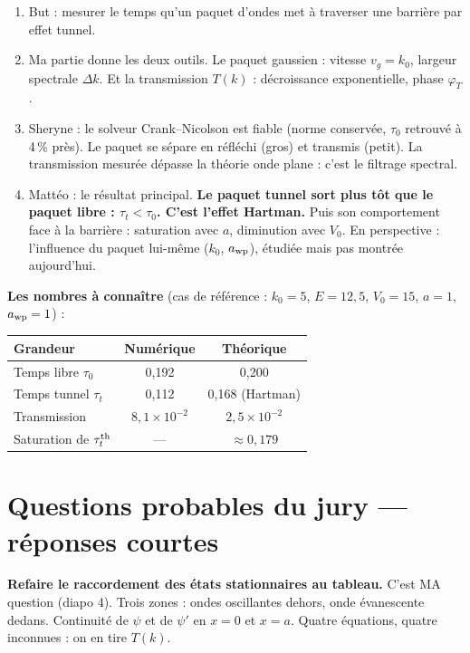\documentclass[12pt,a4paper]{article}
\begin{document}
\begin{enumerate}
\item But : mesurer le temps qu'un paquet d'ondes met à traverser
      une barrière par effet tunnel.
\item Ma partie donne les deux outils.
      Le paquet gaussien : vitesse $v_g = k_0$, largeur spectrale $\Delta k$.
      Et la transmission $T(k)$ : décroissance exponentielle, phase $\varphi_T$.
\item Sheryne : le solveur Crank--Nicolson est fiable
      (norme conservée, $\tau_0$ retrouvé à 4\,\% près).
      Le paquet se sépare en réfléchi (gros) et transmis (petit).
      La transmission mesurée dépasse la théorie onde plane :
      c'est le filtrage spectral.
\item Mattéo : le résultat principal.
      \textbf{Le paquet tunnel sort plus tôt que le paquet libre :
      $\tau_t < \tau_0$. C'est l'effet Hartman.}
      Puis son comportement face à la barrière : saturation avec $a$,
      diminution avec $V_0$. En perspective : l'influence du paquet
      lui-même ($k_0$, $a_{\rm wp}$), étudiée mais pas montrée aujourd'hui.
\end{enumerate}

\textbf{Les nombres à connaître} (cas de référence : $k_0 = 5$, $E = 12{,}5$,
$V_0 = 15$, $a = 1$, $a_{\rm wp} = 1$) :

\begin{center}
\begin{tabular}{lcc}
\toprule
Grandeur & Numérique & Théorique \\
\midrule
Temps libre $\tau_0$ & 0{,}192 & 0{,}200 \\
Temps tunnel $\tau_t$ & 0{,}112 & 0{,}168 (Hartman) \\
Transmission & $8{,}1\times10^{-2}$ & $2{,}5\times10^{-2}$ \\
Saturation de $\tau_t^{\rm th}$ & --- & $\approx 0{,}179$ \\
\bottomrule
\end{tabular}
\end{center}

\clearpage
\section*{Questions probables du jury --- réponses courtes}

\textbf{Refaire le raccordement des états stationnaires au tableau.}
C'est MA question (diapo 4).
Trois zones : ondes oscillantes dehors, onde évanescente dedans.
Continuité de $\psi$ et de $\psi'$ en $x=0$ et $x=a$.
Quatre équations, quatre inconnues : on en tire $T(k)$.
\end{document}
